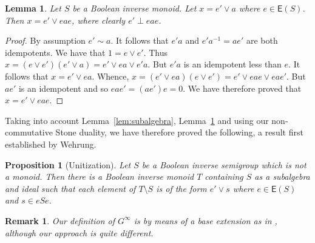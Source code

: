 \documentclass[a4paper]{amsart}
\newtheorem{lemma}[theorem]{Lemma}
\newtheorem{proposition}[theorem]{Proposition}
\newtheorem{remark}[theorem]{Remark}
\begin{document}
\begin{lemma}\label{lem:one-point-groupoid}
Let $S$ be a Boolean inverse monoid.
Let $x = e' \vee a$ where $e \in \mathsf{E}(S)$.
Then $x = e' \vee eae$, where clearly $e' \perp eae$.
\end{lemma} 
\begin{proof} By assumption $e' \sim a$.
It follows that $e'a$ and $e'a^{-1} = ae'$ are both idempotents.
We have that $1 = e \vee e'$.
Thus $x = (e \vee e')(e' \vee a) = e' \vee ea \vee e'a$.
But $e'a$ is an idempotent less than $e$.
It follows that $x = e' \vee ea$.
Whence, $x = (e' \vee ea)(e \vee e') = e' \vee eae \vee eae'$.
But $ae'$ is an idempotent and so $eae' = (ae')e = 0$.
We have therefore proved that $x = e' \vee eae$.
\end{proof}

Taking into account Lemma~\ref{lem:subalgebra}, Lemma~\ref{lem:one-point-groupoid} 
and using our non-commutative Stone duality,
we have therefore proved the following, a result first established by Wehrung.

\begin{proposition}[Unitization]\label{prop:wehrung} Let $S$ be a Boolean inverse semigroup which is not a monoid.
Then there is a Boolean inverse monoid $T$ containing $S$ as a subalgebra and ideal
such that each element of $T \setminus S$ is of the form $e' \vee s$ where $e \in \mathsf{E}(S)$
and $s \in eSe$.
\end{proposition} 

\begin{remark}{\em 
Our definition of $G^{\infty}$ is by means of a base extension as in \cite{MR}, although our approach is quite different.}
\end{remark}
\end{document}
